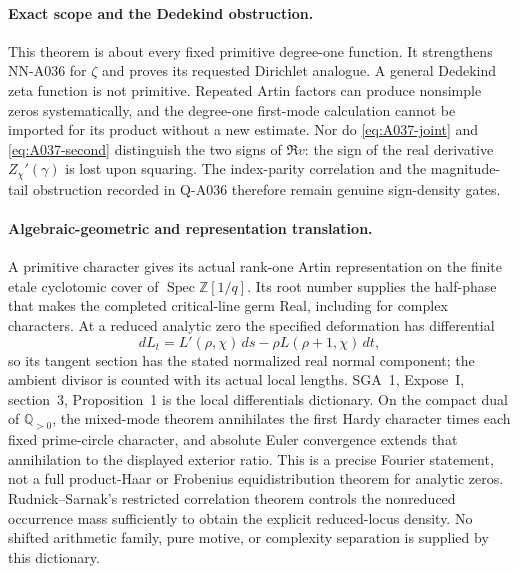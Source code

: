 \paragraph{Exact scope and the Dedekind obstruction.}
This theorem is about every fixed primitive degree-one function. It
strengthens NN-A036 for $\zeta$ and proves its requested Dirichlet
analogue. A general Dedekind zeta function is not primitive. Repeated
Artin factors can produce nonsimple zeros systematically, and the
degree-one first-mode calculation cannot be imported for its product
without a new estimate. Nor do \eqref{eq:A037-joint} and
\eqref{eq:A037-second} distinguish the two signs of $\Re v$: the
sign of the real derivative $Z_\chi'(\gamma)$ is lost upon squaring.
The index-parity correlation and the magnitude-tail obstruction
recorded in Q-A036 therefore remain genuine sign-density gates.

\paragraph{Algebraic-geometric and representation translation.}
A primitive character gives its actual rank-one Artin representation
on the finite etale cyclotomic cover of
$\operatorname{Spec}\mathbb Z[1/q]$. Its root number supplies the
half-phase that makes the completed critical-line germ Real, including
for complex characters. At a reduced analytic zero the specified
deformation has differential
\[
 dL_t=L'(\rho,\chi)\,ds-\rho L(\rho+1,\chi)\,dt,
\]
so its tangent section has the stated normalized real normal
component; the ambient divisor is counted with its actual local
lengths. SGA~1, Expose~I, section~3, Proposition~1 is the local
differentials dictionary. On the compact dual of $\mathbb Q_{>0}$,
the mixed-mode theorem annihilates the first Hardy character times
each fixed prime-circle character, and absolute Euler convergence
extends that annihilation to the displayed exterior ratio. This is
a precise Fourier statement, not a full product-Haar or Frobenius
equidistribution theorem for analytic zeros. Rudnick--Sarnak's
restricted correlation theorem controls the nonreduced occurrence
mass sufficiently to obtain the explicit reduced-locus density.
No shifted arithmetic family, pure motive, or complexity separation
is supplied by this dictionary.

